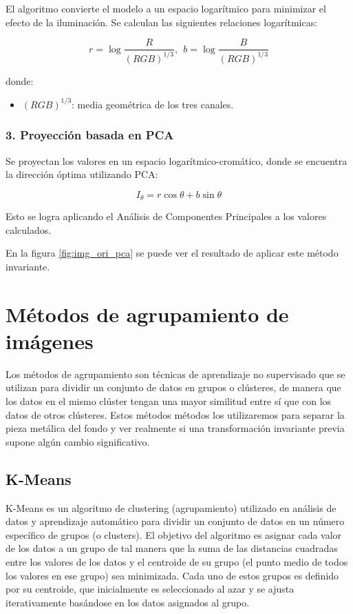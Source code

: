 El algoritmo convierte el modelo a un espacio logarítmico para minimizar el efecto de la iluminación. Se calculan las siguientes relaciones logarítmicas:

$$r=\log \frac{R}{(RGB)^{1/3} },~~b=\log \frac{B}{(RGB)^{1/3} }$$

donde:

\begin{itemize}
\setlength{\itemsep}{-1ex}
   \item{\begin{flushleft} $(RGB)^{1/3}$: media geométrica de los tres canales. \end{flushleft}}
\end{itemize}

\subsubsection{3. Proyección basada en PCA}

Se proyectan los valores en un espacio logarítmico-cromático, donde se encuentra la dirección óptima utilizando PCA:

$$I_{\theta } =r\cos \theta +b\sin \theta$$

Esto se logra aplicando el Análisis de Componentes Principales a los valores calculados.

En la figura \ref{fig:img_ori_pca} se puede ver el resultado de aplicar este método invariante.

\section{Métodos de agrupamiento de imágenes}\label{metodos-de-agrupamiento-de-imagenes}

Los métodos de agrupamiento son técnicas de aprendizaje no supervisado que se utilizan para dividir un conjunto de datos en grupos o clústeres, de manera que los datos en el mismo clúster tengan una mayor similitud entre sí que con los datos de otros clústeres. Estos métodos métodos los utilizaremos para separar la pieza metálica del fondo y ver realmente si una transformación invariante previa supone algún cambio significativo.

\subsection{K-Means}\label{k-means}

K-Means \cite{MATLAB:2023bKmeans} es un algoritmo de clustering (agrupamiento) utilizado en análisis de datos y aprendizaje automático para dividir un conjunto de datos en un número específico de grupos (o clusters). El objetivo del algoritmo es asignar cada valor de los datos a un grupo de tal manera que la suma de las distancias cuadradas entre los valores de los datos y el centroide de su grupo (el punto medio de todos los valores en ese grupo) sea minimizada. Cada uno de estos grupos es definido por su centroide, que inicialmente es seleccionado al azar y se ajusta iterativamente basándose en los datos asignados al grupo.

